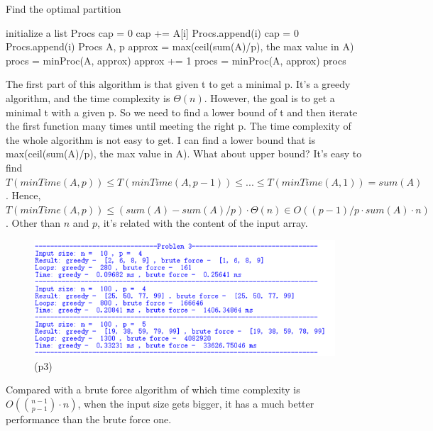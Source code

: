 \documentclass{article}       %
\begin{document}
\begin{enumerate}
	\begin{algorithm}[H]
		\caption{Find the optimal partition}
		\small
		\begin{algorithmic}[1]
			\State initialize a list Procs
			\State cap = 0
			\State cap += A[i]
			\State Procs.append(i)
			\Else
			\State cap = 0
			\State Procs.append(i)
			\EndIf
			\EndIf
			\EndFor
			\State \Return Procs
			\EndProcedure
			 {A, p}
			\State approx = max(ceil(sum(A)/p), the max value in A)
			\State procs = minProc(A, approx)
			\State approx += 1
			\State procs = minProc(A, approx)
			\EndWhile
			\State \Return procs
			\EndProcedure
		\end{algorithmic}\label{p3}
	\end{algorithm}
	The first part of this algorithm is that given t to get a minimal p. It's a greedy algorithm, and the time complexity is $\Theta (n)$. However, the goal is to get a minimal t with a given p. So we need to find a lower bound of t and then iterate the first function many times until meeting the right p.\newline
	The time complexity of the whole algorithm is not easy to get. I can find a lower bound that is max(ceil(sum(A)/p), the max value in A). What about upper bound? It's easy to find $T(minTime(A, p)) \leq  T(minTime(A, p-1)) \leq ... \leq T(minTime(A, 1)) = sum(A)$. Hence, $T(minTime(A, p)) \leq (sum(A)-sum(A)/p)\cdot \Theta (n) \in O((p-1)/p \cdot sum(A) \cdot n)$. Other than $n$ and $p$, it's related with the content of the input array.
	\begin{figure}[H]
		\centering
		\includegraphics[width=15cm]{p3}
		\caption{(p3)}
		\label{p3}
	\end{figure}
	Compared with a brute force algorithm of which time complexity is $O({{n-1}\choose{p-1}} \cdot n)$, when the input size gets bigger, it has a much better performance than the brute force one.\newline
	 

\end{enumerate}
\end{document}
